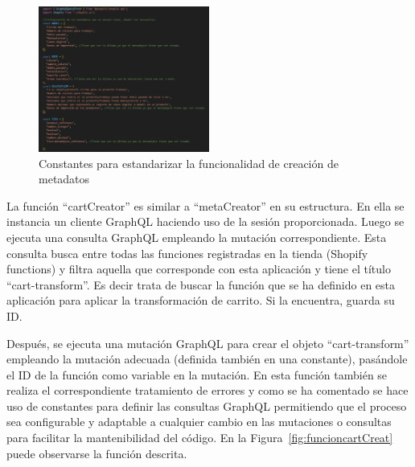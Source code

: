 \documentclass[11pt]{article}
\begin{document}
\begin{figure}[H]
    \centering
    \includegraphics[width=0.5\textwidth]{imagenes-back/metafieldCreatorConstantes1.png}
    \caption{\label{fig:constantesMetafields} Constantes para estandarizar la funcionalidad de creación de metadatos }
    \vspace{\fill}
\end{figure}

La función ``cartCreator'' es similar a ``metaCreator'' en su estructura. En ella se instancia un cliente GraphQL haciendo uso de la sesión
proporcionada. Luego se ejecuta una consulta GraphQL empleando la mutación correspondiente. Esta consulta 
busca entre todas las funciones registradas en la tienda (Shopify functions) y filtra aquella que corresponde con esta aplicación y tiene el título ``cart-transform''.
Es decir trata de buscar la función que se ha definido en esta aplicación para aplicar la transformación de carrito. Si la encuentra, guarda su ID.

Después, se ejecuta una mutación GraphQL para crear el objeto ``cart-transform'' empleando la mutación adecuada (definida también en una constante), pasándole
el ID de la función como variable en la mutación. En esta función también se realiza el correspondiente tratamiento de errores y como se ha comentado
se hace uso de constantes para definir las consultas GraphQL permitiendo que el proceso sea configurable y adaptable a cualquier cambio en las mutaciones
o consultas para facilitar la mantenibilidad del código. En la Figura~\ref{fig:funcioncartCreat} puede observarse la función descrita.
\end{document}
